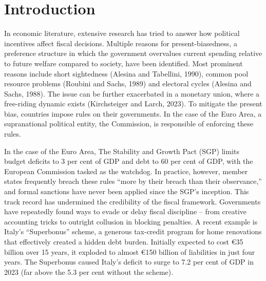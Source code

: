 \documentclass{article}
\begin{document}
\tableofcontents
\newpage





\section{Introduction}
In economic literature, extensive research has tried to answer how political incentives affect fiscal decisions. Multiple reasons for present-biasedness, a preference structure in which the
government overvalues current spending relative to future welfare compared to society, have been identified. Most prominent reasons include short sightedness (Alesina
and Tabellini, 1990), common pool resource problems (Roubini and Sachs, 1989) and electoral cycles
(Alesina and Sachs, 1988). The issue can be further exacerbated in a monetary union, where a free-riding dynamic exists (Kirchsteiger and Larch, 2023). To mitigate the present bias, countries impose rules on their governments. In the case of the Euro Area, a supranational political entity, the Commission, is responsible of enforcing these rules. 

In the case of the Euro Area, The Stability and Growth Pact (SGP) limits budget deficits to 3 per cent of GDP and debt to 60 per cent of GDP, with the European Commission tasked as the watchdog. In practice, however, member states frequently breach these rules “more by their breach than their observance,” and formal sanctions have never been applied since the SGP’s inception. This track record has undermined the credibility of the fiscal framework. Governments have repeatedly found ways to evade or delay fiscal discipline – from creative accounting tricks to outright collusion in blocking penalties. A recent example is Italy’s “Superbonus” scheme, a generous tax-credit program for home renovations that effectively created a hidden debt burden. Initially expected to cost €35 billion over 15 years, it exploded to almost €150 billion of liabilities in just four years. The Superbonus caused Italy’s deficit to surge to 7.2 per cent of GDP in 2023 (far above the 5.3 per cent without the scheme).
\end{document}
